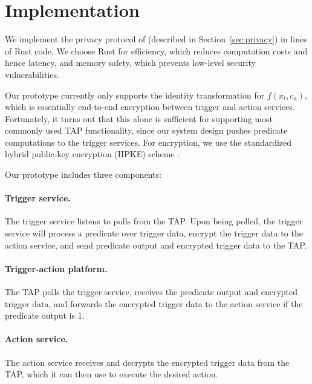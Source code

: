 \section{Implementation}
\label{sec:implementation}

We implement the privacy protocol of \sys (described in
Section~\ref{sec:privacy}) in  lines of Rust code. We choose Rust for
efficiency, which reduces computation costs and hence latency, and memory
safety, which prevents low-level security vulnerabilities.

Our \sys prototype currently only supports the identity transformation for
$f(x_t, c_a)$, which is essentially end-to-end encryption between trigger and
action services. Fortunately, it turns out that this alone is sufficient for
supporting most commonly used TAP functionality, since our system design pushes
predicate computations to the trigger services. For encryption, we use the
standardized hybrid public-key encryption (HPKE) scheme .

Our prototype includes three components:

\paragraph{Trigger service.} The trigger service listens to polls from the
    TAP. Upon being polled, the trigger service will process a predicate over
    trigger data, encrypt the trigger data to the action service, and send
    predicate output and encrypted trigger data to the TAP.
    
\paragraph{Trigger-action platform.} The TAP polls the trigger service,
    receives the predicate output and encrypted trigger data, and forwards the
    encrypted trigger data to the action service if the predicate output is 1.
    
\paragraph{Action service.} The action service receives and decrypts the
    encrypted trigger data from the TAP, which it can then use to execute the
    desired action.


